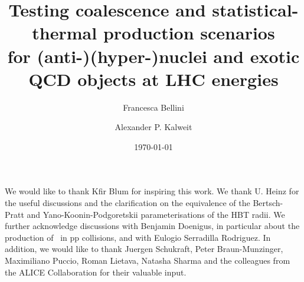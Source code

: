 \documentclass[%
 reprint,
 amsmath,amssymb,
 aps,
]{revtex4-1}
\begin{document}

\title{Testing coalescence and statistical-thermal production scenarios\\for (anti-)(hyper-)nuclei and exotic QCD objects at LHC energies}

\author{Francesca Bellini}
\author{Alexander P. Kalweit}%

\date{\today}%

\begin{abstract}

\end{abstract}

\maketitle



\begin{acknowledgments}
We would like to thank Kfir Blum for inspiring this work. We thank U. Heinz for the useful discussions and the clarification on the equivalence of the Bertsch-Pratt and Yano-Koonin-Podgoretskii parameterisations of the HBT radii. We further acknowledge discussions with Benjamin Doenigus, in particular about the production of \hthreelambda\ in pp collisions, and with Eulogio Serradilla Rodriguez. In addition, we would like to thank Juergen Schukraft, Peter Braun-Munzinger, Maximiliano Puccio, Roman Lietava, Natasha Sharma and the colleagues from the ALICE Collaboration for their valuable input. 
\end{acknowledgments}


\end{document}
